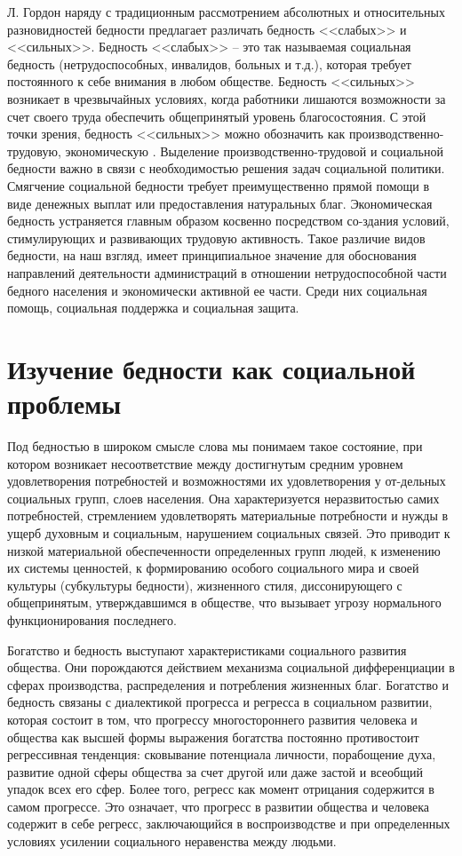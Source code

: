 Л. Гордон наряду с традиционным рассмотрением абсолютных и относительных 
разновидностей бедности предлагает различать бедность <<слабых>> и <<сильных>>. 
Бедность <<слабых>> -- это так называемая социальная бедность 
(нетрудоспособных, инвалидов, больных и т.д.), которая требует постоянного к 
себе внимания в любом обществе. Бедность <<сильных>> возникает в чрезвычайных 
условиях, когда работники лишаются возможности за счет своего труда обеспечить 
общепринятый уровень благосостояния. С этой точки зрения, бедность 
<<сильных>> можно обозначить как производственно-трудовую, экономическую 
\cite{volch_s2}. Выделение производственно-трудовой и социальной бедности важно 
в связи с необходимостью решения задач социальной политики. Смягчение 
социальной бедности требует преимущественно прямой помощи в виде денежных 
выплат или предоставления натуральных благ. Экономическая бедность устраняется 
главным образом косвенно посредством со-здания условий, стимулирующих и 
развивающих трудовую активность. Такое различие видов бедности, на наш взгляд, 
имеет принципиальное значение для обоснования направлений деятельности 
администраций в отношении нетрудоспособной части бедного населения и 
экономически активной ее части. Среди них социальная помощь, социальная 
поддержка и социальная защита.

\section{Изучение бедности как социальной проблемы}
Под бедностью в широком смысле слова мы понимаем такое состояние, при котором 
возникает несоответствие между достигнутым средним уровнем удовлетворения 
потребностей и возможностями их удовлетворения у от-дельных социальных 
групп, слоев населения. Она характеризуется неразвитостью самих потребностей, 
стремлением удовлетворять материальные потребности и нужды в ущерб духовным и 
социальным, нарушением социальных связей. Это приводит к низкой материальной 
обеспеченности определенных групп людей, к изменению их системы ценностей, к 
формированию особого социального мира и своей культуры (субкультуры бедности), 
жизненного стиля, диссонирующего с общепринятым, утверждавшимся в обществе, 
что вызывает угрозу нормального функционирования последнего.

Богатство и бедность выступают характеристиками социального развития общества. 
Они порождаются действием механизма социальной дифференциации в сферах 
производства, распределения и потребления жизненных благ. Богатство и бедность 
связаны с диалектикой прогресса и регресса в социальном развитии, которая 
состоит в том, что прогрессу многостороннего развития человека и общества 
как высшей формы выражения богатства постоянно противостоит регрессивная 
тенденция: сковывание потенциала личности, порабощение духа, развитие одной 
сферы общества за счет другой или даже застой и всеобщий упадок всех его 
сфер. Более того, регресс как момент отрицания содержится в самом прогрессе. 
Это означает, что прогресс в развитии общества и человека содержит в себе 
регресс, заключающийся в воспроизводстве и при определенных условиях усилении 
социального неравенства между людьми.

